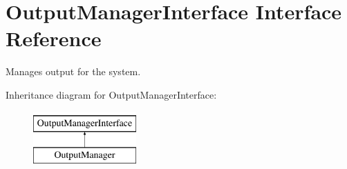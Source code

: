 \hypertarget{interfaceOutputManagerInterface}{\section{Output\-Manager\-Interface Interface Reference}
\label{interfaceOutputManagerInterface}
}


Manages output for the system.  


Inheritance diagram for Output\-Manager\-Interface\-:\begin{figure}[H]
\begin{center}
\leavevmode
\includegraphics[height=2.000000cm]{interfaceOutputManagerInterface}
\end{center}
\end{figure}
